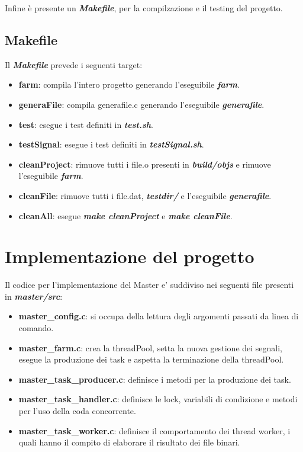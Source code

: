 \documentclass{article}
\begin{document}
Infine è presente un \textbf{\textit{Makefile}}, per la compilzazione e il testing del progetto.

\subsection{Makefile}
Il \textbf{\textit{Makefile}} prevede i seguenti target:

\begin{itemize}
    \itemsep 0em
    \item \textbf{farm}: compila l'intero progetto generando l'eseguibile \textbf{\textit{farm}}.
    \item \textbf{generaFile}: compila generafile.c generando l'eseguibile \textbf{\textit{generafile}}.
    \item \textbf{test}: esegue i test definiti in \textbf{\textit{test.sh}}.
    \item \textbf{testSignal}: esegue i test definiti in \textbf{\textit{testSignal.sh}}.
    \item \textbf{cleanProject}: rimuove tutti i file.o presenti in \textbf{\textit{build/objs}} e rimuove l'eseguibile \textbf{\textit{farm}}.
    \item \textbf{cleanFile}: rimuove tutti i file.dat, \textbf{\textit{testdir/}} e l'eseguibile \textbf{\textit{generafile}}.
    \item \textbf{cleanAll}: esegue \textbf{\textit{make cleanProject}} e \textbf{\textit{make cleanFile}}.
\end{itemize}

\section{Implementazione del progetto}

Il codice per l'implementazione del Master e' suddiviso nei seguenti file presenti in \textbf{\textit{master/src}}:

\begin{itemize}
    \itemsep 0em
    \item \textbf{master\_config.c}: si occupa della lettura degli argomenti passati da linea di comando.
    \item \textbf{master\_farm.c}: crea la threadPool, setta la nuova gestione dei segnali, esegue la produzione dei task e aspetta la terminazione della threadPool.
    \item \textbf{master\_task\_producer.c}: definisce i metodi per la produzione dei task.
    \item \textbf{master\_task\_handler.c}: definisce le lock, variabili di condizione e metodi per l'uso della coda concorrente.
    \item \textbf{master\_task\_worker.c}: definisce il comportamento dei thread worker, i quali hanno il compito di elaborare il risultato dei file binari.
\end{itemize}
\end{document}
